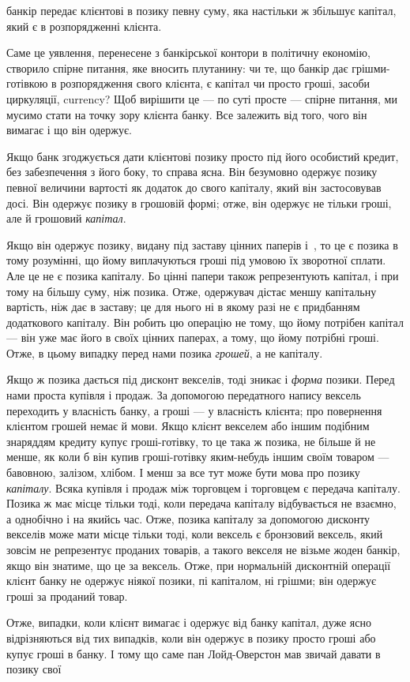\parcont{}  %
банкір передає клієнтові в позику певну суму, яка настільки ж
збільшує капітал, який є в розпорядженні клієнта.

Саме це уявлення, перенесене з банкірської контори в політичну економію, створило спірне питання,
яке вносить плутанину: чи те, що банкір дає грішми-готівкою в розпорядження
свого клієнта, є капітал чи просто гроші, засоби циркуляції,
currency? Щоб вирішити це — по суті просте — спірне питання,
ми мусимо стати на точку зору клієнта банку. Все залежить
від того, чого він вимагає і що він одержує.

Якщо банк згоджується дати клієнтові позику просто під
його особистий кредит, без забезпечення з його боку, то справа
ясна. Він безумовно одержує позику певної величини вартості
як додаток до свого капіталу, який він застосовував досі. Він
одержує позику в грошовій формі; отже, він одержує не тільки
гроші, але й грошовий \emph{капітал}.

Якщо він одержує позику, видану під заставу цінних паперів і~, то це є позика в тому розумінні,
що йому виплачуються гроші під умовою їх зворотної сплати. Але це не є
позика капіталу. Бо цінні папери також репрезентують капітал,
і при тому на більшу суму, ніж позика. Отже, одержувач дістає меншу капітальну вартість, ніж дає в
заставу; це для нього
ні в якому разі не є придбанням додаткового капіталу. Він робить цю операцію не тому, що йому
потрібен капітал — він уже
має його в своїх цінних паперах, а тому, що йому потрібні гроші.
Отже, в цьому випадку перед нами позика \emph{грошей}, а не капіталу.

Якщо ж позика дається під дисконт векселів, тоді зникає і \emph{форма}
позики. Перед нами проста купівля і продаж. За допомогою передатного напису вексель переходить у
власність банку, а гроші — у власність клієнта; про повернення клієнтом грошей немає й мови. Якщо
клієнт векселем або іншим подібним знаряддям
кредиту купує гроші-готівку, то це така ж позика, не більше
й не менше, як коли б він купив гроші-готівку яким-небудь
іншим своїм товаром — бавовною, залізом, хлібом. І менш за
все тут може бути мова про позику \emph{капіталу}. Всяка купівля і продаж між торговцем і торговцем є
передача капіталу.
Позика ж має місце тільки тоді, коли передача капіталу відбувається не взаємно, а однобічно і на
якийсь час. Отже, позика
капіталу за допомогою дисконту векселів може мати місце
тільки тоді, коли вексель є бронзовий вексель, який зовсім не
репрезентує проданих товарів, а такого векселя не візьме жоден
банкір, якщо він знатиме, що це за вексель. Отже, при нормальній дисконтній операції клієнт банку не
одержує ніякої позики,
пі капіталом, ні грішми; він одержує гроші за проданий товар.

Отже, випадки, коли клієнт вимагає і одержує від банку
капітал, дуже ясно відрізняються від тих випадків, коли він
одержує в позику просто гроші або купує гроші в банку. І тому
що саме пан Лойд-Оверстон мав звичай давати в позику свої
\parbreak{}  %
